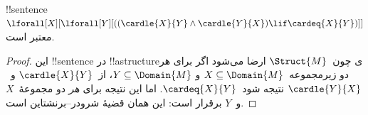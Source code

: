 \documentclass[../../../include/open-logic-section]{subfiles}
\begin{document}
\begin{prop}
!!{sentence}~$\lforall[X][\lforall[Y][((\cardle{X}{Y} \land
    \cardle{Y}{X}) \lif \cardeq{X}{Y})]]$ معتبر است.
\end{prop}

\begin{proof}
این !!{sentence} در !!a{structure}ی چون~$\Struct{M}$ ارضا می‌شود اگر
برای هر دو زیرمجموعه~$X \subseteq \Domain{M}$ و
$Y \subseteq \Domain{M}$، از~$\cardle{X}{Y}$ و~$\cardle{Y}{X}$ نتیجه
شود~$\cardeq{X}{Y}$. اما این نتیجه برای \emph{هر} دو مجموعهٔ~$X$ و~$Y$
برقرار است: این همان قضیهٔ شرودر--برنشتاین است.
\end{proof}
\end{document}
